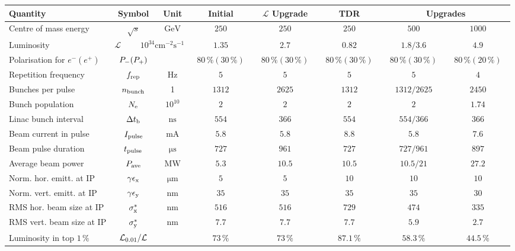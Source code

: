 \begin{table}[tbhp]
\begin{adjustbox}{width=1.\textwidth,center=\textwidth}
\begin{tabular}{lccccccc}
Quantity & Symbol & Unit & Initial & ${\mathcal{L}}$ Upgrade & TDR &  \multicolumn{2}{c}{Upgrades} \\
\hline
Centre of mass energy & $\sqrt{s}$ & ${\mathrm{GeV}}$ & $250$ & $250$ & $250$ & $500$ & $1000$ \\
Luminosity & \multicolumn{2}{c}{${\mathcal{L}}$ ~~~~$10^{34}{\mathrm{cm^{-2}s^{-1}}}$} & $1.35$ & $2.7$ & $0.82$ & $1.8 / 3.6$ & $4.9$ \\
Polarisation for $e^- (e^+)$ & $P_{\mathrm{-}} (P_{\mathrm{+}})$ & & ~$80\,\% (30\,\%)$~ &  ~$80\,\% (30\,\%)$~ &  ~$80\,\% (30\,\%)$~ &~$80\,\% (30\,\%)$~ &  ~$80\,\% (20\,\%)$~  \\
Repetition frequency &$f_{\mathrm{{rep}}}$ & ${\mathrm{Hz}}$  & $5$ & $5$ & $5$ & $5$ & $4$ \\
Bunches per pulse  &$n_{\mathrm{{bunch}}}$ & 1  & $1312$ & $2625$ & $1312$ & $1312 / 2625$ & $2450$ \\
Bunch population  &$N_{\mathrm{{e}}}$ & $10^{10}$ & $2$ &  $2$ & $2$ & $2$ & $1.74$ \\
Linac bunch interval & $\Delta t_{\mathrm{{b}}}$ & ${\mathrm{ns}}$ & $554$ & $366$ & $554$ & $554 / 366$ & $366$ \\
Beam current in pulse & $I_{\mathrm{{pulse}}}$ & ${\mathrm{mA}}$& $5.8$ & $5.8$& $8.8$ & $5.8$ & $7.6$  \\
Beam pulse duration  & $t_{\mathrm{{pulse}}}$ & ${\mathrm{\mu s}}$ & $727$ & $961$ & $727$ & $727 / 961$ & $897$ \\
Average beam power  & $P_{\mathrm{{ave}}}$   & ${\mathrm{MW}}$ & $5.3$ & $10.5$ & $10.5$ & $10.5 / 21$  & $27.2$ \\  
Norm. hor. emitt. at IP & $\gamma\epsilon_{\mathrm{{x}}}$ & ${\mathrm{\mu m}}$& $5$ & $5$ & $10$ & $10$ & $10$  \\ 
Norm. vert. emitt. at IP & $\gamma\epsilon_{\mathrm{{y}}}$ & ${\mathrm{nm}}$ & $35$ & $35$ & $35$ & $35$ & $30$ \\ 
RMS hor. beam size at IP  & $\sigma^*_{\mathrm{{x}}}$ & ${\mathrm{nm}}$  & $516$ & $516$ & $729$ & $474$ & $335$ \\
RMS vert. beam size at IP &$\sigma^*_{\mathrm{{y}}}$ & ${\mathrm{nm}}$ & $7.7$  & $7.7$  & $7.7$  & $5.9$ & $2.7$ \\
Luminosity in top $1\,\%$ & ${\mathcal{L}}_{\mathrm{0.01}} / {\mathcal{L}}$ &  & $73\,\%$  &  $73\,\%$ & $87.1\,\%$  & $58.3\,\%$ & $44.5\,\%$\\

\end{tabular}
\end{adjustbox}
\end{table}
